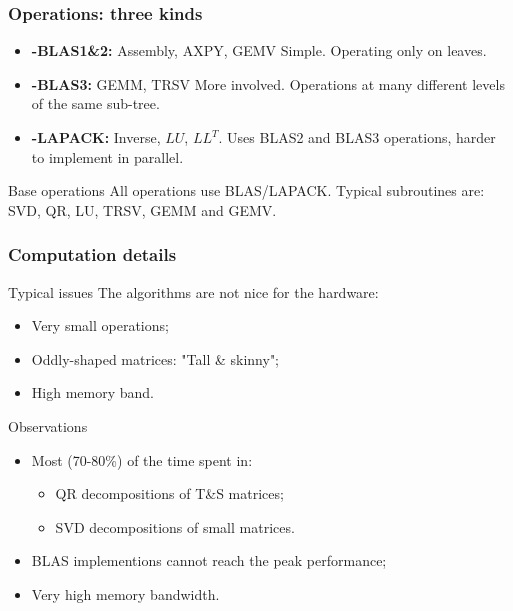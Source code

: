 \begin{frame}
\frametitle{Operations: three kinds}

\begin{itemize}
  \item \textbf{\hh-BLAS1\&2:} Assembly, AXPY, GEMV \newline
        Simple. Operating only on leaves.
  \item \textbf{\hh-BLAS3:} GEMM, TRSV \newline 
        More involved. Operations at many different levels of the same sub-tree.
  \item \textbf{\hh-LAPACK:} Inverse, $LU$, $LL^T$.\newline
        Uses BLAS2 and BLAS3 operations, harder to implement in parallel.
\end{itemize}

\begin{block}{Base operations}
All operations use BLAS/LAPACK. Typical subroutines are: SVD, QR, 
LU, TRSV, GEMM and GEMV.
\end{block}
\end{frame}


\begin{frame}
\frametitle{Computation details}
\begin{block}{Typical issues}
The \hmat algorithms are not nice for the hardware:
\begin{itemize}
\item Very small operations; 
\item Oddly-shaped matrices: "Tall \& skinny";
\item High memory band.
\end{itemize}
\end{block}

\begin{block}{Observations}
  \begin{itemize}
    \item Most (70-80\%) of the time spent in: 
    \begin{itemize}
      \item QR decompositions of T\&S matrices; 
      \item SVD decompositions of small matrices.
    \end{itemize}
    \item BLAS implementions cannot reach the peak performance;
    \item Very high memory bandwidth.
  \end{itemize}
\end{block}
\end{frame}

